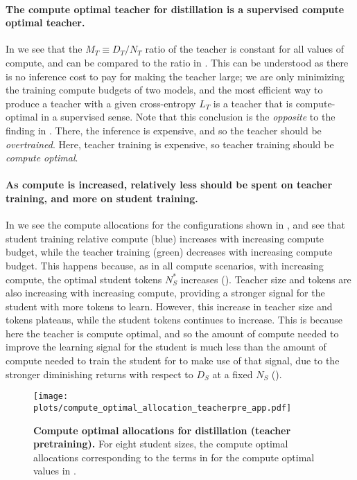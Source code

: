 \paragraph{The compute optimal teacher for distillation is a supervised compute optimal teacher.}
In 
we see that the $M_T\equiv D_T/N_T$ ratio of the teacher is constant for all values of compute, 
and can be compared to the ratio in .
This can be understood as there is no inference cost to pay for making the teacher large;
we are only minimizing the training compute budgets of two models,
and the most efficient way to produce a teacher with a given cross-entropy $L_T$ is a teacher that is compute-optimal in a supervised sense.
Note that this conclusion is the \emph{opposite} to the finding in .
There, the inference is expensive, and so the teacher should be \emph{overtrained}.
Here, teacher training is expensive, so teacher training should be \emph{compute optimal}.

\paragraph{As compute is increased, relatively less should be spent on teacher training, and more on student training.}
In  we see the compute allocations for the configurations shown in 
,
and see that student training relative compute (blue) increases with increasing compute budget, 
while the teacher training (green) decreases with increasing compute budget.
This happens because, as in all compute scenarios, with increasing compute, the optimal student tokens $N_S^*$ increases 
().
Teacher size and tokens are also increasing with increasing compute, providing a stronger signal for the student with more tokens to learn.
However, this increase in teacher size and tokens plateaus, while the student tokens continues to increase.
This is because here the teacher is compute optimal, and so the amount of compute needed to improve the learning signal for the student is much less than the amount of compute needed to train the student for to make use of that signal, due to the stronger diminishing returns with respect to $D_S$ at a fixed $N_S$ ().

\begin{figure}[h]
	\centering
	\texttt{[image: plots/compute\_optimal\_allocation\_teacherpre\_app.pdf]}
	\caption{\textbf{Compute optimal allocations for distillation (teacher pretraining).} For eight student sizes, the compute optimal allocations corresponding to the terms in  for the compute optimal values in .}
	\label{fig:compute-optimal-allocation-teacherpre-app}
\end{figure}

